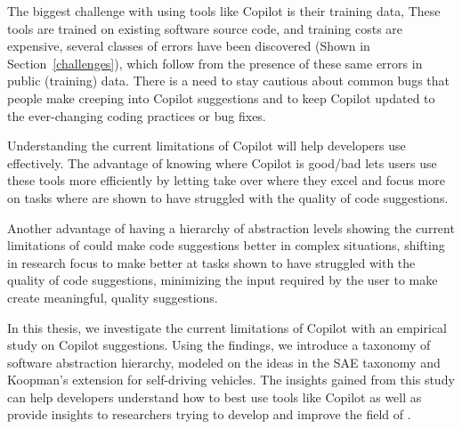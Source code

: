 The biggest challenge with using tools like Copilot is their training data, These tools are trained on existing software source code, and training costs are expensive, several classes of errors have been discovered (Shown in Section~\ref{challenges}), which follow from the presence of these same errors in public (training) data. There is a need to stay cautious about common bugs that people make creeping into Copilot suggestions and to keep Copilot updated to the ever-changing coding practices or bug fixes.

Understanding the current limitations of Copilot will help developers use \cct{} effectively. The advantage of knowing where Copilot is good/bad lets users use these tools more efficiently by letting \cct{} take over where they excel and focus more on tasks where \cct{} are shown to have struggled with the quality of code suggestions.

Another advantage of having a hierarchy of abstraction levels showing the current limitations of \cct{} could make code suggestions better in complex situations, shifting in research focus to make \cct{} better at tasks shown to have struggled with the quality of code suggestions, minimizing the input required by the user to make \cct{} create meaningful, quality suggestions.

In this thesis, we investigate the current limitations of Copilot with an empirical study on Copilot suggestions. Using the findings, we introduce a taxonomy of software abstraction hierarchy, modeled on the ideas in the SAE taxonomy and Koopman's extension for self-driving vehicles. The insights gained from this study can help developers understand how to best use tools like Copilot as well as provide insights to researchers trying to develop and improve the field of \cct{}.




